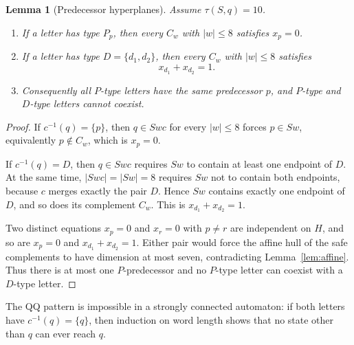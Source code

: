 \documentclass[11pt]{article}
\newtheorem{lemma}{Lemma}
\theoremstyle{definition}
\theoremstyle{remark}
\begin{document}
\begin{lemma}[Predecessor hyperplanes]\label{lem:predhyper}
Assume $\tau(S,q)=10$.
\begin{enumerate}[label=(\roman*)]
\item If a letter has type $P_p$, then every $C_w$ with $|w|\le8$ satisfies $x_p=0$.
\item If a letter has type $D=\{d_1,d_2\}$, then every $C_w$ with $|w|\le8$ satisfies
\[
x_{d_1}+x_{d_2}=1.
\]
\item Consequently all $P$-type letters have the same predecessor $p$, and $P$-type and $D$-type letters cannot coexist.
\end{enumerate}
\end{lemma}
\begin{proof}
If $c^{-1}(q)=\{p\}$, then $q\in Swc$ for every $|w|\le8$ forces $p\in Sw$, equivalently $p\notin C_w$, which is $x_p=0$.

If $c^{-1}(q)=D$, then $q\in Swc$ requires $Sw$ to contain at least one endpoint of $D$. At the same time, $|Swc|=|Sw|=8$ requires $Sw$ not to contain both endpoints, because $c$ merges exactly the pair $D$. Hence $Sw$ contains exactly one endpoint of $D$, and so does its complement $C_w$. This is $x_{d_1}+x_{d_2}=1$.

Two distinct equations $x_p=0$ and $x_r=0$ with $p\ne r$ are independent on $H$, and so are $x_p=0$ and $x_{d_1}+x_{d_2}=1$. Either pair would force the affine hull of the safe complements to have dimension at most seven, contradicting Lemma~\ref{lem:affine}. Thus there is at most one $P$-predecessor and no $P$-type letter can coexist with a $D$-type letter.
\end{proof}

The QQ pattern is impossible in a strongly connected automaton: if both letters have $c^{-1}(q)=\{q\}$, then induction on word length shows that no state other than $q$ can ever reach $q$.
\end{document}
